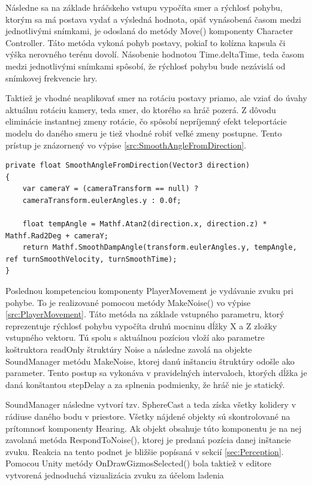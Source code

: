 \documentclass[slovak, master]{diploma}
\begin{document}
Následne sa na základe hráčskeho vstupu vypočíta smer a rýchlosť pohybu, ktorým sa má postava vydať a výsledná hodnota, opäť vynásobená časom medzi jednotlivými snímkami, je odoslaná do metódy Move() komponenty Character Controller. Táto metóda vykoná pohyb postavy, pokiaľ to kolízna kapsula či výška nerovného terénu dovolí. Násobenie hodnotou Time.deltaTime, teda časom medzi jednotlivými snímkami spôsobí, že rýchlosť pohybu bude nezávislá od snímkovej frekvencie hry.

Taktiež je vhodné neaplikovať smer na rotáciu postavy priamo, ale vziať do úvahy aktuálnu rotáciu kamery, teda smer, do ktorého sa hráč pozerá. Z dôvodu eliminácie instantnej zmeny rotácie, čo spôsobí nepríjemný efekt teleportácie modelu do daného smeru je tiež vhodné robiť veľké zmeny postupne. Tento prístup je znázornený vo výpise \ref{src:SmoothAngleFromDirection}.

\vspace{8pt}
\begin{lstlisting}[label=src:SmoothAngleFromDirection,caption={Postupná zmena rotácie postavy v súlade s rotáciu kamery}]
private float SmoothAngleFromDirection(Vector3 direction)
{
    var cameraY = (cameraTransform == null) ? 
    cameraTransform.eulerAngles.y : 0.0f;

    float tempAngle = Mathf.Atan2(direction.x, direction.z) * Mathf.Rad2Deg + cameraY;
    return Mathf.SmoothDampAngle(transform.eulerAngles.y, tempAngle, ref turnSmoothVelocity, turnSmoothTime);
}
\end{lstlisting}

Poslednou kompetenciou komponenty PlayerMovement je vydávanie zvuku pri pohybe. To je realizované pomocou metódy MakeNoise() vo výpise \ref{src:PlayerMovement}. Táto metóda na základe vstupného parametru, ktorý reprezentuje rýchlosť pohybu vypočíta druhú mocninu dĺžky X a Z zložky vstupného vektoru. Tú spolu s aktuálnou pozíciou vloží ako parametre koštruktora readOnly štruktúry Noise a následne zavolá na objekte SoundManager metódu MakeNoise, ktorej danú inštanciu štruktúry odošle ako parameter. Tento postup sa vykonáva v pravidelných intervaloch, ktorých dĺžka je daná konštantou stepDelay a za splnenia podmienky, že hráč nie je statický. 

SoundManager následne vytvorí tzv. SphereCast a teda získa všetky kolidery v rádiuse daného bodu v priestore. Všetky nájdené objekty sú skontrolované na prítomnosť komponenty Hearing. Ak objekt obsahuje túto komponentu je na nej zavolaná metóda RespondToNoise(), ktorej je predaná pozícia danej inštancie zvuku. Reakcia na tento podnet je bližšie popísaná v sekcií \ref{sec:Perception}. Pomocou Unity metódy OnDrawGizmosSelected() bola taktiež v editore vytvorená jednoduchá vizualizácia zvuku za účelom ladenia
\end{document}
